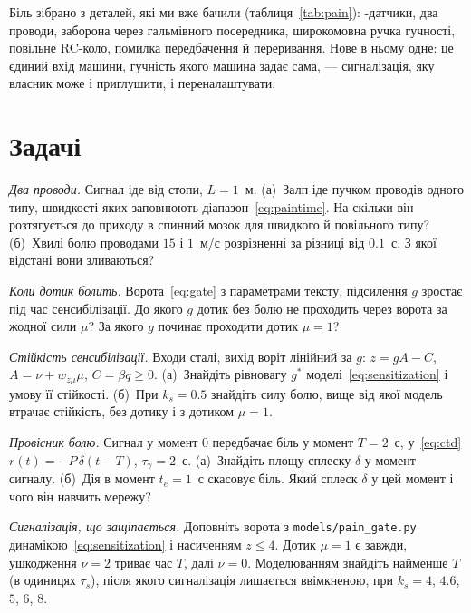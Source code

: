 Біль зібрано з деталей, які ми вже бачили (таблиця~\ref{tab:pain}): -датчики, два проводи, заборона через гальмівного посередника, широкомовна ручка гучності, повільне RC-коло, помилка передбачення й переривання. Нове в ньому одне: це єдиний вхід машини, гучність якого машина задає сама, --- сигналізація, яку власник може і приглушити, і переналаштувати.

\section{Задачі}

\begin{exercise}[\lvlA]
\label{ex:14:1}
\emph{Два проводи.} Сигнал іде від стопи, $L=1$~м. (а)~Залп іде пучком проводів одного типу, швидкості яких заповнюють діапазон~\eqref{eq:paintime}. На скільки він розтягується до приходу в спинний мозок для швидкого й повільного типу? (б)~Хвилі болю проводами $15$ і $1$~м/с розрізненні за різниці від $0.1$~с. З якої відстані вони зливаються?
\end{exercise}

\begin{exercise}[\lvlB]
\label{ex:14:2}
\emph{Коли дотик болить.} Ворота~\eqref{eq:gate} з параметрами тексту, підсилення $g$ зростає під час сенсибілізації. До якого $g$ дотик без болю не проходить через ворота за жодної сили $\mu$? За якого $g$ починає проходити дотик $\mu=1$?
\end{exercise}

\begin{exercise}[\lvlB]
\label{ex:14:3}
\emph{Стійкість сенсибілізації.} Входи сталі, вихід воріт лінійний за $g$: $z=gA-C$, $A=\nu+w_{z\mu}\mu$, $C=\beta q\ge0$. (а)~Знайдіть рівновагу $g^*$ моделі~\eqref{eq:sensitization} і умову її стійкості. (б)~При $k_s=0.5$ знайдіть силу болю, вище від якої модель втрачає стійкість, без дотику і з дотиком $\mu=1$.
\end{exercise}

\begin{exercise}[\lvlA]
\label{ex:14:4}
\emph{Провісник болю.} Сигнал у момент $0$ передбачає біль у момент $T=2$~с, у~\eqref{eq:ctd} $r(t)=-P\,\delta(t-T)$, $\tau_\gamma=2$~с. (а)~Знайдіть площу сплеску $\delta$ у момент сигналу. (б)~Дія в момент $t_e=1$~с скасовує біль. Який сплеск $\delta$ у цей момент і чого він навчить мережу?
\end{exercise}

\begin{exercise}[\lvlB]
\label{ex:14:5}
\emph{Сигналізація, що защіпається.} Доповніть ворота з \texttt{models/\allowbreak pain\_gate.py} динамікою~\eqref{eq:sensitization} і насиченням $z\le4$. Дотик $\mu=1$ є завжди, ушкодження $\nu=2$ триває час $T$, далі $\nu=0$. Моделюванням знайдіть найменше $T$ (в одиницях $\tau_s$), після якого сигналізація лишається ввімкненою, при $k_s=4$, $4.6$, $5$, $6$, $8$.
\end{exercise}

